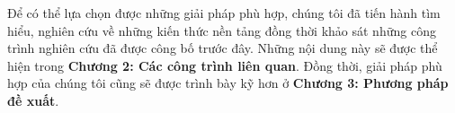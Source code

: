 Để có thể lựa chọn được những giải pháp phù hợp, chúng tôi đã tiến hành tìm hiểu, nghiên cứu về những kiến thức nền tảng đồng thời khảo sát những công trình nghiên cứu đã được công bố trước đây. Những nội dung này sẽ được thể hiện trong \textbf{Chương 2: Các công trình liên quan}. Đồng thời, giải pháp phù hợp của chúng tôi cũng sẽ được trình bày kỹ hơn ở \textbf{Chương 3: Phương pháp đề xuất}.

